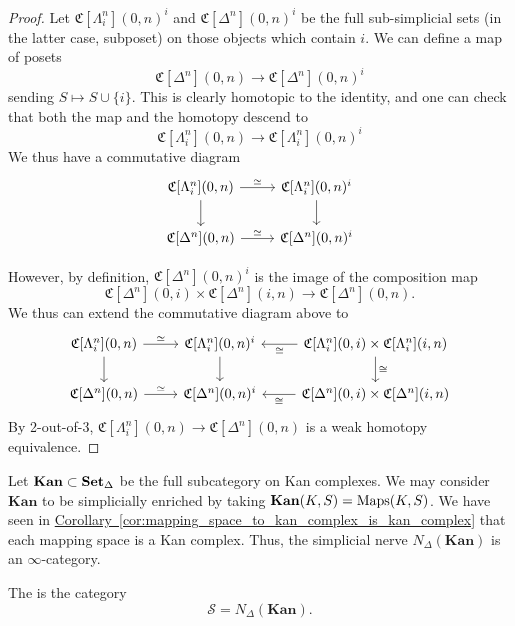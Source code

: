 \begin{proof}
	Let $\mathfrak{C}[\Lambda^n_i](0,n)^i$ and $\mathfrak{C}[\Delta^n](0,n)^i$ be the full sub-simplicial sets (in the latter case, subposet) on those objects which contain $i$. We can define a map of posets 
	\[
	\mathfrak{C}[\Delta^n](0,n)\to \mathfrak{C}[\Delta^n](0,n)^i
	\]
	sending $S\mapsto S\cup\{i\}$. This is clearly homotopic to the identity, and one can check that both the map and the homotopy descend to
	\[
	\mathfrak{C}[\Lambda^n_i](0,n)\to\mathfrak{C}[\Lambda^n_i](0,n)^i
	\]
	We thus have a commutative diagram 
	\[
	\begin{tikzcd}
	\mathfrak{C}[\Lambda^n_i](0,n)\arrow[r,"\simeq"]\arrow[d] & \mathfrak{C}[\Lambda^n_i](0,n)^i\arrow[d] \\
	\mathfrak{C}[\Delta^n](0,n)\arrow[r,"\simeq"] & \mathfrak{C}[\Delta^n](0,n)^i
	\end{tikzcd}
	\]
	
	However, by definition, $\mathfrak{C}[\Delta^n](0,n)^i$ is the image of the composition map 
	\[
	\mathfrak{C}[\Delta^n](0,i)\times \mathfrak{C}[\Delta^n](i,n)\to \mathfrak{C}[\Delta^n](0,n). 
	\]
	We thus can extend the commutative diagram above to
		\[
	\begin{tikzcd}
	\mathfrak{C}[\Lambda^n_i](0,n)\arrow[r,"\simeq"]\arrow[d] & \mathfrak{C}[\Lambda^n_i](0,n)^i\arrow[d] & \mathfrak{C}[\Lambda^n_i](0,i)\times \mathfrak{C}[\Lambda^n_i](i,n)\arrow[d,"\cong"]\arrow[l,"\cong"]\\
	\mathfrak{C}[\Delta^n](0,n)\arrow[r,"\simeq"] & \mathfrak{C}[\Delta^n](0,n)^i & \mathfrak{C}[\Delta^n](0,i)\times \mathfrak{C}[\Delta^n](i,n)\arrow[l,"\cong"]
	\end{tikzcd}
	\]
	By 2-out-of-3, $\mathfrak{C}[\Lambda^n_i](0,n)\to 	\mathfrak{C}[\Delta^n](0,n)$ is a weak homotopy equivalence.
\end{proof}

\begin{example}
	Let $\mathbf{Kan} \subset \operatorname{\mathbf{Set}_{\Delta}}$ be the full subcategory on Kan complexes. We may consider $\mathbf{Kan}$ to be simplicially enriched by taking $\mathbf{Kan}(K, S) = \operatorname{Maps}(K, S)$. We have seen in \hyperref[cor:mapping_space_to_kan_complex_is_kan_complex]{Corollary~\ref*{cor:mapping_space_to_kan_complex_is_kan_complex}} that each mapping space is a Kan complex. Thus, the simplicial nerve $N_{\Delta}(\textbf{Kan})$ is an $\infty$-category.
\end{example}

\begin{definition}
	\label{def:category_of_spaces}
	The  is the category
	\begin{equation*}
	\mathcal{S} = N_{\Delta}(\textbf{Kan}).
	\end{equation*}
\end{definition}










